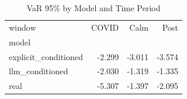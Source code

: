 \begin{table}
\caption{VaR 95\% by Model and Time Period}
\label{tab:var95_periods}
\begin{tabular}{lrrr}
\toprule
window & COVID & Calm & Post \\
model &  &  &  \\
\midrule
explicit_conditioned & -2.299 & -3.011 & -3.574 \\
llm_conditioned & -2.030 & -1.319 & -1.335 \\
real & -5.307 & -1.397 & -2.095 \\
\bottomrule
\end{tabular}
\end{table}
